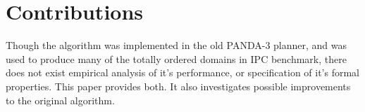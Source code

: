 \section{Contributions} 
Though the algorithm was implemented in the old PANDA-3 planner, and was used to produce many of the totally ordered domains in IPC benchmark, there does not exist empirical analysis of it's performance, or specification of it's formal properties. This paper provides both.
It also investigates possible improvements to the original algorithm.



